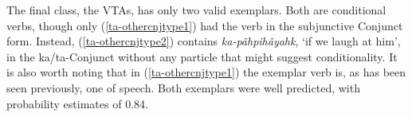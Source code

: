 The final class, the VTAs, has only two valid exemplars. Both are conditional verbs, though only (\ref{ta-othercnjtype1}) had the verb in the subjunctive Conjunct form. Instead, (\ref{ta-othercnjtype2}) contains \textit{ka-pâhpihâyahk}, `if we laugh at him', in the ka/ta-Conjunct without any particle that might suggest conditionality. It is also worth noting that in (\ref{ta-othercnjtype1}) the exemplar verb is, as has been seen previously, one of speech.  Both exemplars were well predicted, with probability estimates of 0.84.
